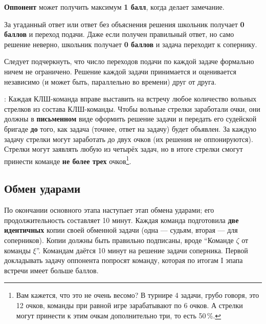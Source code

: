 \documentclass[12pt]{article}
\begin{document}
\textbf{Оппонент} может получить максимум \textbf{1 балл}, когда делает замечание.

За угаданный ответ или ответ без объяснения решения школьник получает \textbf{0 баллов} и переход подачи. 
Даже если получен правильный ответ, но само решение неверно, школьник получает \textbf{0 баллов} и задача переходит к сопернику.

Следует подчеркнуть, что число переходов подачи по каждой задаче формально ничем не ограничено. Решение каждой задачи принимается и оценивается независимо (и может быть, параллельно во времени) друг от друга.

: Каждая КЛШ-команда вправе выставить на встречу любое количество вольных стрелков из состава КЛШ-команды. Чтобы вольные стрелки заработали очки, они должны в {\bf письменном} виде оформить решение задачи и передать его судейской бригаде {\bf до} того, как задача (точнее, ответ на задачу) будет объявлен. За каждую задачу стрелки могут заработать до двух очков (их решения не оппонируются). Стрелки могут заявлять любую из четырёх задач, но в итоге стрелки смогут принести команде {\bf не более трех} очков\footnote{Вам кажется, что это не очень весомо? В турнире 4 задачи, грубо говоря, это 12 очков, команды при равной игре зарабатывают по 6 очков. А стрелки могут принести к этим очкам дополнительно три, то есть 50\,\%.}.

\subsection*{Обмен ударами}
По окончании основного этапа наступает этап обмена ударами; его продолжительность составляет 10 минут. Каждая команда подготовила {\bf две идентичных} копии своей обменной задачи (одна --- судьям, вторая --- для соперников). Копии должны быть правильно подписаны, вроде ``Команде $\zeta$ от команды $\xi$''. Командам даётся 10 минут на решение задачи соперника. Первой докладывать задачу оппонента попросят команду, которая по итогам I эпапа встречи имеет больше баллов.
\end{document}
